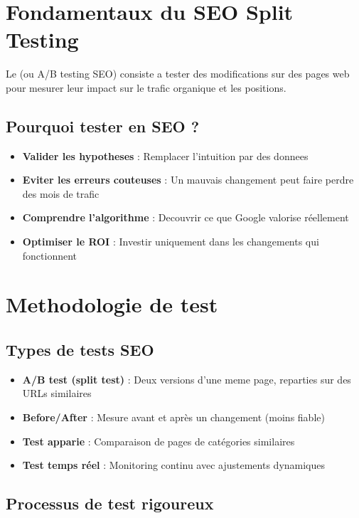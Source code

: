 \section{Fondamentaux du SEO Split Testing}

Le  (ou A/B testing SEO) consiste a tester des modifications sur des pages web pour mesurer leur impact sur le trafic organique et les positions.

\subsection{Pourquoi tester en SEO ?}

\begin{itemize}
    \item \textbf{Valider les hypotheses} : Remplacer l'intuition par des donnees
    \item \textbf{Eviter les erreurs couteuses} : Un mauvais changement peut faire perdre des mois de trafic
    \item \textbf{Comprendre l'algorithme} : Decouvrir ce que Google valorise réellement
    \item \textbf{Optimiser le ROI} : Investir uniquement dans les changements qui fonctionnent
\end{itemize}

\section{Methodologie de test}

\subsection{Types de tests SEO}

\begin{itemize}
    \item \textbf{A/B test (split test)} : Deux versions d'une meme page, reparties sur des URLs similaires
    \item \textbf{Before/After} : Mesure avant et après un changement (moins fiable)
    \item \textbf{Test apparie} : Comparaison de pages de catégories similaires
    \item \textbf{Test temps réel} : Monitoring continu avec ajustements dynamiques
\end{itemize}

\subsection{Processus de test rigoureux}

